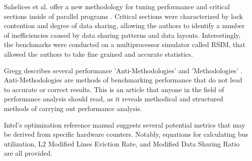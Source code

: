 Sahelices et al. offer a new methodology for tuning performance and critical sections inside of parallel programs \cite{sahelices2009methodology}. Critical sections were characterized by lock contention and degree of data sharing, allowing the authors to identify a number of inefficiencies caused by data sharing patterns and data layouts. Interestingly, the benchmarks were conducted on a multiprocessor simulator called RSIM, that allowed the authors to take fine grained and accurate statistics.

Gregg describes several performance 'Anti-Methodologies' and 'Methodologies' \cite{methodologygregg}. Anti-Methodologies are methods of benchmarking performance that do not lead to accurate or correct results. This is an article that anyone in the field of performance analysis should read, as it reveals methodical and structured methods of carrying out performance analysis.

Intel's optimization reference manual \cite{intelmanualoptimization} suggests several potential metrics that may be derived from specific hardware counters. Notably, equations for calculating bus utilization, L2 Modified Lines Eviction Rate, and Modified Data Sharing Ratio are all provided.

